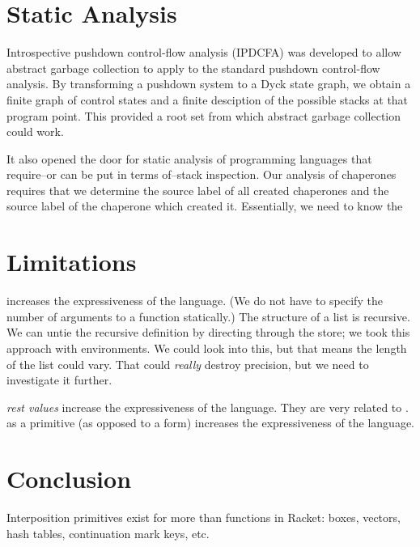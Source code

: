 \documentclass{sigplanconf}
\begin{document}

\section{Static Analysis}

Introspective pushdown control-flow analysis (IPDCFA) was developed to allow abstract garbage collection to apply to the standard pushdown control-flow analysis.
By transforming a pushdown system to a Dyck state graph, we obtain a finite graph of control states and a finite desciption of the possible stacks at that program point.
This provided a root set from which abstract garbage collection could work.

It also opened the door for static analysis of programming languages that require--or can be put in terms of--stack inspection.
Our analysis of chaperones requires that we determine the source label of all created chaperones and the source label of the chaperone which created it.
Essentially, we need to know the 

\section{Limitations}

 increases the expressiveness of the language.
(We do not have to specify the number of arguments to a function statically.)
The structure of a list is recursive.
We can untie the recursive definition by directing through the store; we took this approach with environments.
We could look into this, but that means the length of the list could vary.
That could \emph{really} destroy precision, but we need to investigate it further.

\emph{rest values} increase the expressiveness of the language. They are very related to .
 as a primitive (as opposed to a form) increases the expressiveness of the language.

\section{Conclusion}

Interposition primitives exist for more than functions in Racket: boxes, vectors, hash tables, continuation mark keys, etc.
\end{document}
